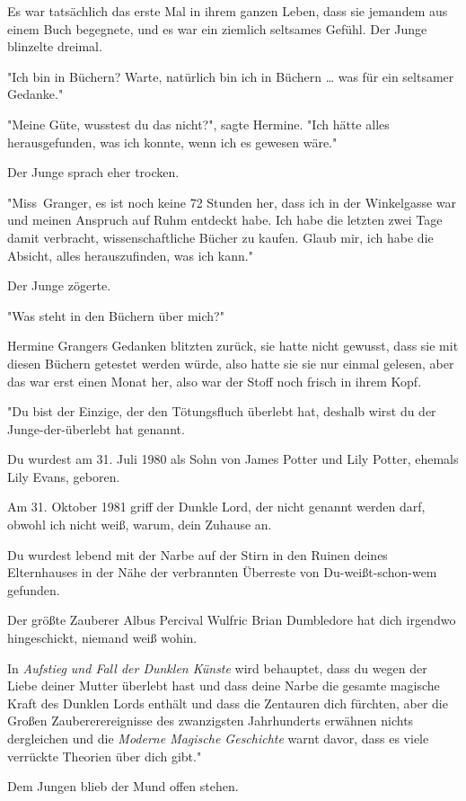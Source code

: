 {Es war tatsächlich das erste Mal in ihrem ganzen Leben, dass sie jemandem aus einem Buch begegnete, und es war ein ziemlich seltsames Gefühl. Der Junge blinzelte dreimal.

"Ich bin in Büchern? Warte, natürlich bin ich in Büchern … was für ein seltsamer Gedanke."

"Meine Güte, wusstest du das nicht?", sagte Hermine. "Ich hätte alles herausgefunden, was ich konnte, wenn ich es gewesen wäre."

Der Junge sprach eher trocken.

"Miss~Granger, es ist noch keine 72 Stunden her, dass ich in der Winkelgasse war und meinen Anspruch auf Ruhm entdeckt habe. Ich habe die letzten zwei Tage damit verbracht, wissenschaftliche Bücher zu kaufen. Glaub mir, ich habe die Absicht, alles herauszufinden, was ich kann."

Der Junge zögerte.

"Was steht in den Büchern über mich?"

Hermine Grangers Gedanken blitzten zurück, sie hatte nicht gewusst, dass sie mit diesen Büchern getestet werden würde, also hatte sie sie nur einmal gelesen, aber das war erst einen Monat her, also war der Stoff noch frisch in ihrem Kopf.

"Du bist der Einzige, der den Tötungsfluch überlebt hat, deshalb wirst du der Junge-der-überlebt hat genannt.

Du wurdest am 31. Juli 1980 als Sohn von James Potter und Lily Potter, ehemals Lily Evans, geboren.

Am 31. Oktober 1981 griff der Dunkle Lord, der nicht genannt werden darf, obwohl ich nicht weiß, warum, dein Zuhause an.

Du wurdest lebend mit der Narbe auf der Stirn in den Ruinen deines Elternhauses in der Nähe der verbrannten Überreste von Du-weißt-schon-wem gefunden.

Der größte Zauberer Albus Percival Wulfric Brian Dumbledore hat dich irgendwo hingeschickt, niemand weiß wohin.

In \emph{Aufstieg und Fall der Dunklen Künste} wird behauptet, dass du wegen der Liebe deiner Mutter überlebt hast und dass deine Narbe die gesamte magische Kraft des Dunklen Lords enthält und dass die Zentauren dich fürchten, aber die Großen Zaubererereignisse des zwanzigsten Jahrhunderts erwähnen nichts dergleichen und die \emph{Moderne Magische Geschichte} warnt davor, dass es viele verrückte Theorien über dich gibt."

Dem Jungen blieb der Mund offen stehen.

}
